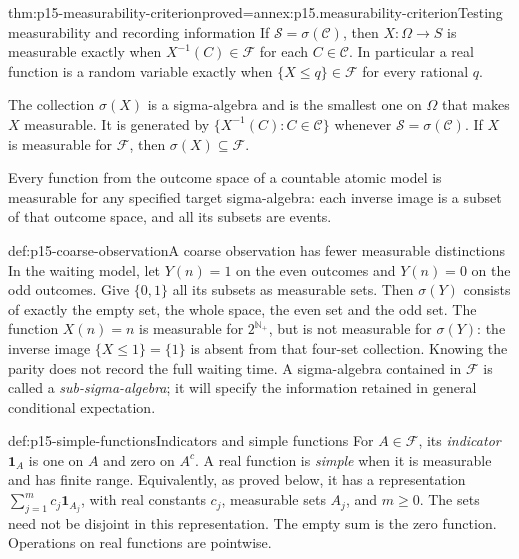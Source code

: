 \begin{hbtheorem}{thm:p15-measurability-criterion}{proved=annex:p15.measurability-criterion}{Testing measurability and recording information}
If \(\mathcal S=\sigma(\mathcal C)\), then \(X:\Omega\to S\)
is measurable exactly when \(X^{-1}(C)\in\mathcal F\) for each
\(C\in\mathcal C\). In particular a real function is a random
variable exactly when \(\{X\leq q\}\in\mathcal F\) for every
rational \(q\).

The collection \(\sigma(X)\) is a sigma-algebra and is the smallest
one on \(\Omega\) that makes \(X\) measurable. It is generated by
\(\{X^{-1}(C):C\in\mathcal C\}\) whenever
\(\mathcal S=\sigma(\mathcal C)\). If \(X\) is measurable for
\(\mathcal F\), then \(\sigma(X)\subseteq\mathcal F\).
\end{hbtheorem}

Every function from the outcome space of a countable atomic model is
measurable for any specified target sigma-algebra: each inverse image is
a subset of that outcome space, and all its subsets are events.

\begin{hbexample}{def:p15-coarse-observation}{A coarse observation has fewer measurable distinctions}
In the waiting model, let \(Y(n)=1\) on the even outcomes and \(Y(n)=0\)
on the odd outcomes. Give \(\{0,1\}\) all its subsets as measurable
sets. Then \(\sigma(Y)\) consists of exactly the empty set, the whole
space, the even set and the odd set. The function \(X(n)=n\) is
measurable for \(2^{\mathbb N_+}\), but is not measurable for
\(\sigma(Y)\): the inverse image \(\{X\leq1\}=\{1\}\) is
absent from that four-set collection. Knowing the parity does not record
the full waiting time. A sigma-algebra contained in \(\mathcal F\) is
called a \emph{sub-sigma-algebra}; it will specify the information retained
in general conditional expectation.
\end{hbexample}

\begin{hbdefinition}{def:p15-simple-functions}{Indicators and simple functions}
For \(A\in\mathcal F\), its \emph{indicator} \(\mathbf1_A\) is one
on \(A\) and zero on \(A^c\). A real function is \emph{simple} when
it is measurable and has finite range. Equivalently, as proved below,
it has a representation \(\sum_{j=1}^m c_j\mathbf1_{A_j}\), with
real constants \(c_j\), measurable sets \(A_j\), and \(m\geq0\).
The sets need not be disjoint in this representation. The empty sum is
the zero function. Operations on real functions are pointwise.
\end{hbdefinition}

